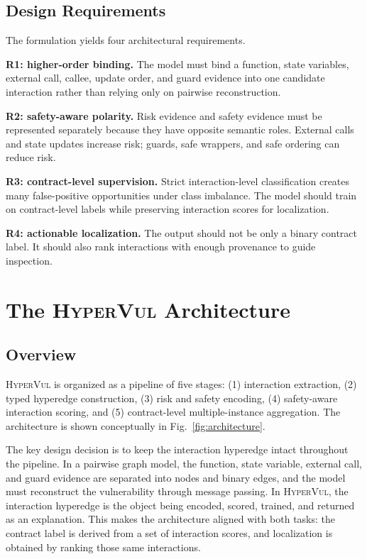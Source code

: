 \documentclass[conference]{IEEEtran}
\newcommand{\tool}{\textsc{HyperVul}}
\begin{document}
\subsection{Design Requirements}

The formulation yields four architectural requirements.

\textbf{R1: higher-order binding.} The model must bind a function, state variables, external call, callee, update order, and guard evidence into one candidate interaction rather than relying only on pairwise reconstruction.

\textbf{R2: safety-aware polarity.} Risk evidence and safety evidence must be represented separately because they have opposite semantic roles. External calls and state updates increase risk; guards, safe wrappers, and safe ordering can reduce risk.

\textbf{R3: contract-level supervision.} Strict interaction-level classification creates many false-positive opportunities under class imbalance. The model should train on contract-level labels while preserving interaction scores for localization.

\textbf{R4: actionable localization.} The output should not be only a binary contract label. It should also rank interactions with enough provenance to guide inspection.

\section{The \tool{} Architecture}

\subsection{Overview}

\tool{} is organized as a pipeline of five stages: (1) interaction extraction, (2) typed hyperedge construction, (3) risk and safety encoding, (4) safety-aware interaction scoring, and (5) contract-level multiple-instance aggregation. The architecture is shown conceptually in Fig.~\ref{fig:architecture}.

The key design decision is to keep the interaction hyperedge intact throughout the pipeline. In a pairwise graph model, the function, state variable, external call, and guard evidence are separated into nodes and binary edges, and the model must reconstruct the vulnerability through message passing. In \tool{}, the interaction hyperedge is the object being encoded, scored, trained, and returned as an explanation. This makes the architecture aligned with both tasks: the contract label is derived from a set of interaction scores, and localization is obtained by ranking those same interactions.
\end{document}
